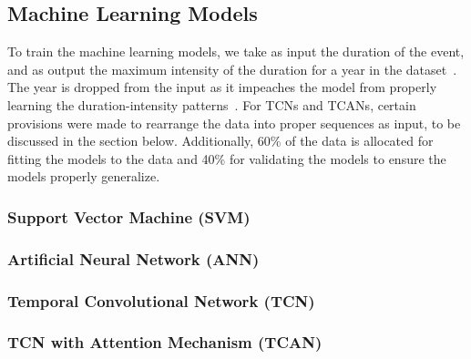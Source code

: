 \subsection{Machine Learning Models}
To train the machine learning models, we take as input the duration of the event, and as output the maximum intensity of the duration for a year in the dataset~\cite{idfkoya}. The year is dropped from the input as it impeaches the model from properly learning the duration-intensity patterns~\cite{idfkoya}. For TCNs and TCANs, certain provisions were made to rearrange the data into proper sequences as input, to be discussed in the section below. Additionally, 60\% of the data is allocated for fitting the models to the data and 40\% for validating the models to ensure the models properly generalize.

\subsubsection{Support Vector Machine (SVM)}

\subsubsection{Artificial Neural Network (ANN)}

\subsubsection{Temporal Convolutional Network (TCN)}

\subsubsection{TCN with Attention Mechanism (TCAN)}
